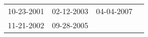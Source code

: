 \begin{supertabular}{llll}
 10-23-2001 &  02-12-2003 &  04-04-2007 \\
 11-21-2002 &  09-28-2005 &             \\
\end{supertabular}
